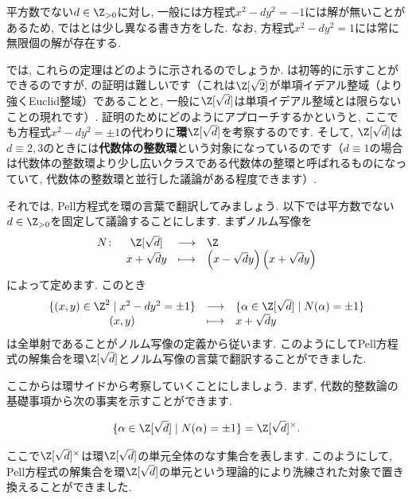 \documentclass[11pt,b5paper,oneside,titlepage,lualatex]{ltjsreport}
\begin{document}
\begin{remark}{}{}
	平方数でない$ d \in \Z_{>0} $に対し, 一般には方程式$ x^2 - dy^2 = -1 $には解が無いことがあるため, ではとは少し異なる書き方をした. 
	なお, 方程式$ x^2 - dy^2 = 1 $には常に無限個の解が存在する. 
\end{remark}

では, これらの定理はどのように示されるのでしょうか. 
は初等的に示すことができるのですが, の証明は難しいです（これは$ \Z[\sqrt{2}] $が単項イデアル整域（より強くEuclid整域）であることと, 一般に$ \Z[\sqrt{d}] $は単項イデアル整域とは限らないことの現れです）. 
証明のためにどのようにアプローチするかというと, ここでも方程式$ x^2 - dy^2 = \pm 1 $の代わりに\textbf{環}$ \Z[\sqrt{d}] $を考察するのです. 
そして, $ \Z[\sqrt{d}] $は$ d \equiv 2, 3 $のときには\textbf{代数体の整数環}という対象になっているのです（$ d \equiv 1 $の場合は代数体の整数環より少し広いクラスである代数体の整環と呼ばれるものになっていて, 代数体の整数環と並行した議論がある程度できます）. 

それでは, Pell方程式を環の言葉で翻訳してみましょう. 
以下では平方数でない$ d \in \Z_{>0} $を固定して議論することにします. 
まずノルム写像を
\[
\begin{array}{cccl}
	N \colon & \Z[\sqrt{d}] & \longrightarrow & \Z \\
	& x + \sqrt{d}y & \longmapsto & \left(x - \sqrt{d}y \right) \left(x + \sqrt{d}y \right)
\end{array}
\]
によって定めます. 
このとき
\[
\begin{array}{ccl}
	\{ (x, y) \in \Z^2 \mid x^2 - dy^2 = \pm 1 \} & \longrightarrow & \{ \alpha \in \Z[\sqrt{d}] \mid N(\alpha) = \pm 1 \} \\
	(x, y) & \longmapsto & x + \sqrt{d}y
\end{array}
\]
は全単射であることがノルム写像の定義から従います. 
このようにしてPell方程式の解集合を環$ \Z[\sqrt{d}] $とノルム写像の言葉で翻訳することができました. 

ここからは環サイドから考察していくことにしましょう. 
まず, 代数的整数論の基礎事項から次の事実を示すことができます. 

\begin{lemma}{}{}
	\[
	\{ \alpha \in \Z[\sqrt{d}] \mid N(\alpha) = \pm 1 \}
	= \Z[\sqrt{d}]^\times.
	\]
\end{lemma}

ここで$ \Z[\sqrt{d}]^\times $は環$ \Z[\sqrt{d}] $の単元全体のなす集合を表します. 
このようにして, Pell方程式の解集合を環$ \Z[\sqrt{d}] $の単元という理論的により洗練された対象で置き換えることができました. 
\end{document}
